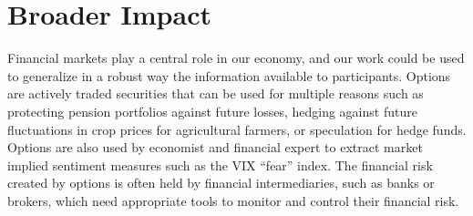 \section*{Broader Impact}\label{sec:impact}

Financial markets play a central role in our economy, and our work could be used to generalize in a robust way the information available to participants.
Options are actively traded securities that can be used for multiple reasons such as protecting pension portfolios against future losses, hedging against future fluctuations in crop prices for agricultural farmers, or speculation for hedge funds.
Options are also used by economist and financial expert to extract market implied sentiment measures such as the VIX ``fear'' index.
The financial risk created by options is often held by financial intermediaries, such as banks or brokers, which need appropriate tools to monitor and control their financial risk.